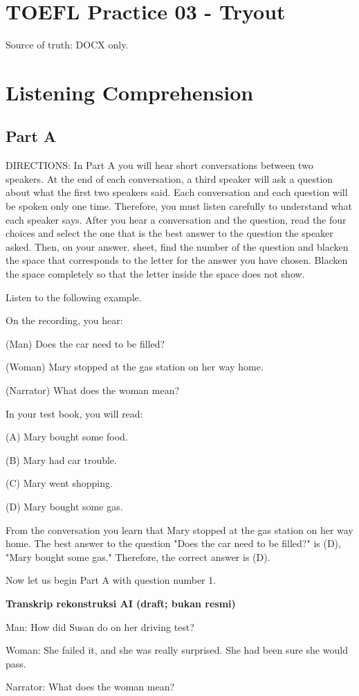 \documentclass[12pt]{article}
\begin{document}
\section*{TOEFL Practice 03 - Tryout}
Source of truth: DOCX only.
\section*{Listening Comprehension}
\subsection*{Part A}
DIRECTIONS: In Part A you will hear short conversations between two speakers. At the end of each conversation, a third speaker will ask a question about what the first two speakers said. Each conversation and each question will be spoken only one time. Therefore, you must listen carefully to understand what each speaker says. After you hear a conversation and the question, read the four choices and select the one that is the best answer to the question the speaker asked. Then, on your answer. sheet, find the number of the question and blacken the space that corresponds to the letter for the answer you have chosen. Blacken the space completely so that the letter inside the space does not show.\par
\begin{exampleblock}
Listen to the following example.\par
On the recording, you hear:\par
(Man) Does the car need to be filled?\par
(Woman) Mary stopped at the gas station on her way home.\par
(Narrator) What does the woman mean?\par
In your test book, you will read:\par
(A) Mary bought some food.\par
(B) Mary had car trouble.\par
(C) Mary went shopping.\par
(D) Mary bought some gas.\par
From the conversation you learn that Mary stopped at the gas station on her way home. The best answer to the question "Does the car need to be filled?" is (D), "Mary bought some gas." Therefore, the correct answer is (D).\par
Now let us begin Part A with question number 1.\par
\end{exampleblock}
\begin{exampleblock}
\textbf{Transkrip rekonstruksi AI (draft; bukan resmi)}\par
Man: How did Susan do on her driving test?\par
Woman: She failed it, and she was really surprised. She had been sure she would pass.\par
Narrator: What does the woman mean?\par
\end{exampleblock}
\end{document}

